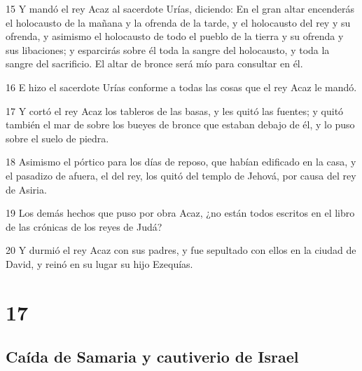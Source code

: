 \par 15 Y mandó el rey Acaz al sacerdote Urías, diciendo: En el gran altar encenderás el holocausto de la mañana y la ofrenda de la tarde, y el holocausto del rey y su ofrenda, y asimismo el holocausto de todo el pueblo de la tierra y su ofrenda y sus libaciones; y esparcirás sobre él toda la sangre del holocausto, y toda la sangre del sacrificio. El altar de bronce será mío para consultar en él.
\par 16 E hizo el sacerdote Urías conforme a todas las cosas que el rey Acaz le mandó.
\par 17 Y cortó el rey Acaz los tableros de las basas, y les quitó las fuentes; y quitó también el mar de sobre los bueyes de bronce que estaban debajo de él, y lo puso sobre el suelo de piedra.
\par 18 Asimismo el pórtico para los días de reposo, que habían edificado en la casa, y el pasadizo de afuera, el del rey, los quitó del templo de Jehová, por causa del rey de Asiria.
\par 19 Los demás hechos que puso por obra Acaz, ¿no están todos escritos en el libro de las crónicas de los reyes de Judá?
\par 20 Y durmió el rey Acaz con sus padres, y fue sepultado con ellos en la ciudad de David, y reinó en su lugar su hijo Ezequías.

\chapter{17}

\section*{Caída de Samaria y cautiverio de Israel}


